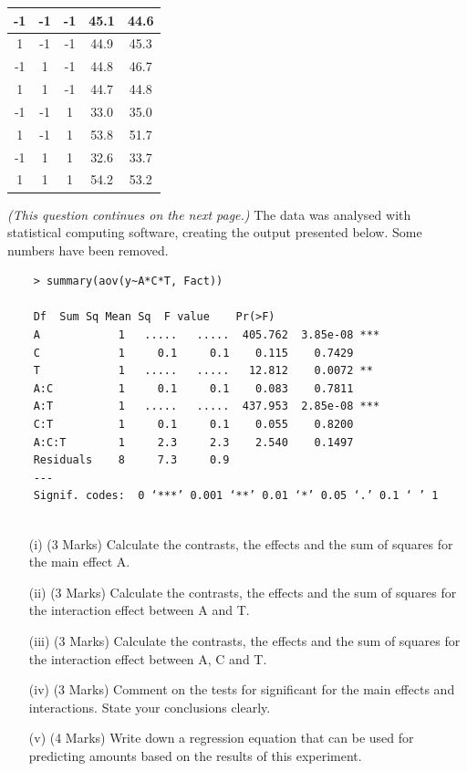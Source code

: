 \documentclass[a4paper,12pt]{article}
\begin{document}
\begin{itemize}
\begin{center}
\begin{tabular}{|c|c|c|c|c|}
					-1	&	-1	&	-1	&	45.1	&	44.6	\\ \hline
					
					1	&	-1	&	-1	&	44.9	&	45.3	\\ \hline
					
					-1	&	1	&	-1	&	44.8	&	46.7	\\ \hline
					
					1	&	1	&	-1	&	44.7	&	44.8	\\ \hline
					
					-1	&	-1	&	1	&	33.0	&	35.0	\\ \hline
					
					1	&	-1	&	1	&	53.8	&	51.7	\\ \hline
					
					-1	&	1	&	1	&	32.6	&	33.7	\\ \hline							
					1	&	1	&	1	&	54.2	&	53.2	\\ \hline
				\end{tabular}
			\end{center}
		
\textit{(This question continues on the next page.)}		
\newpage
The data was analysed with statistical computing software, creating the output presented below. Some numbers have been removed.
\begin{framed}
	\begin{verbatim}
	> summary(aov(y~A*C*T, Fact))
	
	Df  Sum Sq Mean Sq  F value    Pr(>F)    
	A            1   .....   .....  405.762  3.85e-08 ***
	C            1     0.1     0.1    0.115    0.7429    
	T            1   .....   .....   12.812    0.0072 ** 
	A:C          1     0.1     0.1    0.083    0.7811    
	A:T          1   .....   .....  437.953  2.85e-08 ***
	C:T          1     0.1     0.1    0.055    0.8200    
	A:C:T        1     2.3     2.3    2.540    0.1497    
	Residuals    8     7.3     0.9                     
	---
	Signif. codes:  0 ‘***’ 0.001 ‘**’ 0.01 ‘*’ 0.05 ‘.’ 0.1 ‘ ’ 1
	
	\end{verbatim}
\end{framed}	
	\begin{itemize}
		\item[(i)] (3 Marks) Calculate the contrasts, the effects and the sum of squares for the main effect A. 
		\item[(ii)] (3 Marks) Calculate the contrasts, the effects and the sum of squares for the interaction effect between A and T.
		\item[(iii)] (3 Marks) Calculate the contrasts, the effects and the sum of squares for the interaction effect between A, C and T.

		\item[(iv)] (3 Marks) Comment on the tests for significant for the main effects and interactions. State your conclusions clearly.
		\item[(v)] (4 Marks) Write down a regression equation that can be used for predicting amounts based on the results of this experiment.
	\end{itemize}
	
\end{itemize}	
\end{document}
